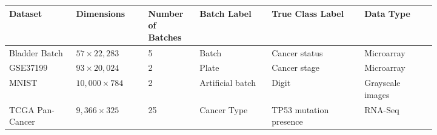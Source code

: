 \begin{tabular}{|p{0.13\linewidth}|p{0.14\linewidth}|p{0.09\linewidth}|p{0.14\linewidth}|p{0.18\linewidth}|p{0.14\linewidth}|}
  \hline
  Dataset & Dimensions & Number of Batches & Batch Label & True Class Label & Data Type \\
  \hline
  Bladder Batch & $57\times22,283$ & 5 & Batch & Cancer status & Microarray \\
  \hline
  GSE37199 & $93\times20,024$ & 2 & Plate & Cancer stage & Microarray \\
  \hline
  MNIST & $10,000\times784$ & 2 & Artificial batch & Digit & Grayscale images \\
  \hline
  TCGA Pan-Cancer & $9,366\times325$ & 25 & Cancer Type & TP53 mutation presence & RNA-Seq \\
  \hline
\end{tabular}
